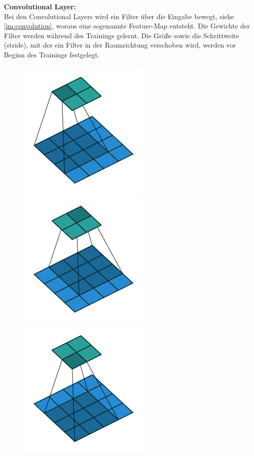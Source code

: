 \documentclass[twoside, 12pt,a4paper]{book}
\numberwithin{equation}{section}
\begin{document}
	\noindent\textbf{Convolutional Layer:}\\
	Bei den Convolutional Layers wird ein Filter über die Eingabe bewegt, siehe \autoref{im:convolution}, woraus eine sogenannte Feature-Map entsteht. Die Gewichte der Filter werden während des Trainings gelernt. Die Größe sowie die Schrittweite (stride), mit der ein Filter in der Raumrichtung verschoben wird, werden vor Beginn des Trainings festgelegt.
	
	\begin{figure}[ht]
		\centering
		\includegraphics[width=0.1\textheight]{frame_0_delay-1s.png}
		\includegraphics[width=0.1\textheight]{frame_1_delay-1s.png}
		\includegraphics[width=0.1\textheight]{frame_2_delay-1s.png}		

\end{figure}
\end{document}

